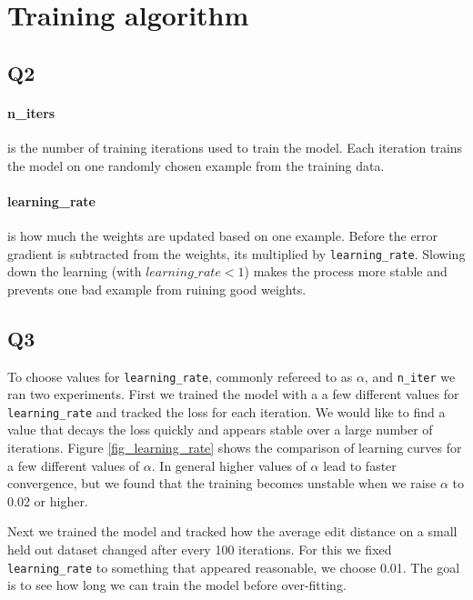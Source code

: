 \documentclass[12pt]{article}
\begin{document}

\section{Training algorithm}

\subsection{Q2}

\paragraph{n\_iters} is the number of training iterations used to train the model. Each iteration trains the model on one randomly chosen example from the training data.

\paragraph{learning\_rate} is how much the weights are updated based on one example. Before the error gradient is subtracted from the weights, its multiplied by \texttt{learning\_rate}. Slowing down the learning (with $learning\_rate < 1$) makes the process more stable and prevents one bad example from ruining good weights.


\subsection{Q3}

To choose values for \texttt{learning\_rate}, commonly refereed to as $\alpha$, and \texttt{n\_iter} we ran two experiments. 
First we trained the model with a a few different values for \texttt{learning\_rate} and tracked the loss for each iteration. We would like to find a value that decays the loss quickly and appears stable over a large number of iterations.
Figure \ref{fig_learning_rate} shows the comparison of learning curves for a few different values of $\alpha$. In general higher values of $\alpha$ lead to faster convergence, but we found that the training becomes unstable when we raise $\alpha$ to 0.02 or higher. 

Next we trained the model and tracked how the average edit distance on a small held out dataset changed after every 100 iterations. For this we fixed \texttt{learning\_rate} to something that appeared reasonable, we choose 0.01. The goal is to see how long we can train the model before over-fitting.
\end{document}
